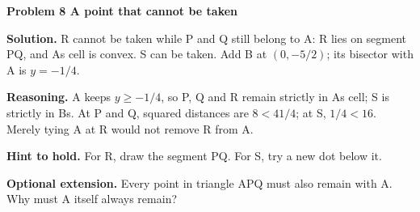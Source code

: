 \documentclass[letterpaper,11pt]{article}
\begin{document}
\vfill
{\large\bfseries Problem 8 A point that cannot be taken}\par
\vspace{3pt}
\noindent\begin{minipage}[t]{.58\textwidth}\vspace{0pt}
\fontsize{10.8}{13.2}\selectfont
\textbf{Solution.} R cannot be taken while P and Q still belong to A: R lies on segment PQ, and A\textquotesingle s cell is convex. S can be taken. Add B at $(0,-5/2)$; its bisector with A is $y=-1/4$.

\textbf{Reasoning.} A keeps $y\geq-1/4$, so P, Q and R remain strictly in A\textquotesingle s cell; S is strictly in B\textquotesingle s. At P and Q, squared distances are $8<41/4$; at S, $1/4<16$. Merely tying A at R would not remove R from A.

\textbf{Hint to hold.} For R, draw the segment PQ. For S, try a new dot below it.

\textbf{Optional extension.} Every point in triangle APQ must also remain with A. Why must A itself always remain?
\end{minipage}\hfill\begin{minipage}[t]{.40\textwidth}\vspace{0pt}\centering
{}
\end{minipage}
\end{document}
